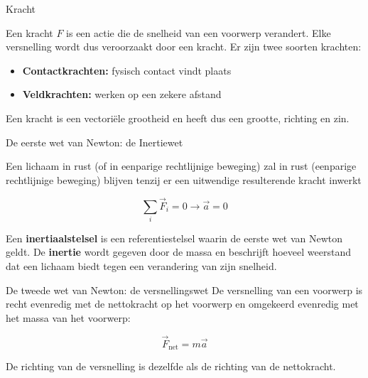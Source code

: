 \begin{theo}[Kracht]{Kracht}

    Een kracht $F$ is een actie die de snelheid van een voorwerp verandert. Elke versnelling wordt dus veroorzaakt door een kracht. Er zijn twee soorten krachten: 

    \begin{itemize}
        \item \textbf{Contactkrachten:} fysisch contact vindt plaats
        \item \textbf{Veldkrachten:} werken op een zekere afstand
    \end{itemize}

    \hspace{-0.65cm} Een kracht is een vectoriële grootheid en heeft dus een grootte, richting en zin.

\end{theo}

\begin{lem}{De eerste wet van Newton: de Inertiewet}

    Een lichaam in rust (of in eenparige rechtlijnige beweging) zal in rust (eenparige rechtlijnige beweging) blijven tenzij er een uitwendige resulterende kracht inwerkt

        \begin{equation*}
            \sum_{i} \Vec{F}_i = 0 \to \Vec{a} = 0
        \end{equation*}

    \hspace{-0.65cm} Een \textbf{inertiaalstelsel} is een referentiestelsel waarin de eerste wet van Newton geldt. De \textbf{inertie} wordt gegeven door de massa en beschrijft hoeveel weerstand dat een lichaam biedt tegen een verandering van zijn snelheid. 


\end{lem}

\begin{lem}{De tweede wet van Newton: de versnellingswet}
    De versnelling van een voorwerp is recht evenredig met de nettokracht op het voorwerp en omgekeerd evenredig met het massa van het voorwerp:

    \begin{equation*}
        \Vec{F}_{\text{net}} = m\vec{a} 
    \end{equation*}

    \noindent De richting van de versnelling is dezelfde als de richting van de nettokracht.
\end{lem}


